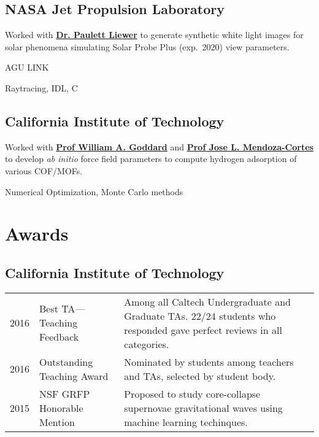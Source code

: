 \documentclass[]{yubo-resume-openfont}
\begin{document}
\begin{minipage}[t]{0.66\textwidth}
\subsection{NASA Jet Propulsion Laboratory}
\begin{tightemize}
    \item Worked with \textbf{\href{TODO}{Dr. Paulett Liewer}} to generate
        synthetic white light images for solar phenomena simulating Solar Probe
        Plus (exp.~2020) view parameters.
    \item AGU LINK %
    \item Raytracing, IDL, C
\end{tightemize}
\sectionsep

\subsection{California Institute of Technology}
\begin{tightemize}
    \item Worked with \textbf{\href{TODO}{Prof William A. Goddard}} and
        \textbf{\href{TODO}{Prof Jose L. Mendoza-Cortes}} to develop \emph{ab
        initio} force field parameters to compute hydrogen adsorption of various
        COF/MOFs.
    \item Numerical Optimization, Monte Carlo methods
\end{tightemize}
\sectionsep


\section{Awards}
\subsection{California Institute of Technology}
\begin{tabular}{p{20pt}p{80pt}p{7.5cm}}
    2016 & Best TA---Teaching Feedback & Among all Caltech Undergraduate and
    Graduate TAs. 22/24 students who responded gave perfect reviews in all
    categories.\\
    2016 & Outstanding Teaching Award & Nominated by students among teachers and
    TAs, selected by student body.\\
    2015 & NSF GRFP Honorable Mention & Proposed to study core-collapse
    supernovae gravitational waves using machine learning techinques.
\end{tabular}
\sectionsep

\end{minipage}
\end{document}
